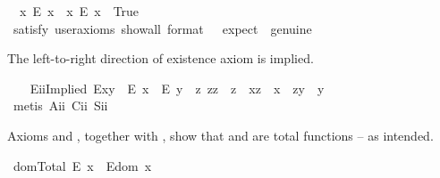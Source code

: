 \begin{isabellebody}
\ \ {\isachardoublequoteopen}{\isacharparenleft}{\isasymexists}x{\isachardot}\ \isactrlbold {\isasymnot}{\isacharparenleft}E\ x{\isacharparenright}{\isacharparenright}\ {\isasymand}\ {\isacharparenleft}{\isasymexists}x{\isachardot}\ {\isacharparenleft}E\ x{\isacharparenright}{\isacharparenright}{\isachardoublequoteclose}\ \ True\ \ %
\ \isanewline
\ \ \ \ \isamarkupfalse%
\ {\isacharbrackleft}satisfy{\isacharcomma}\ user{\isacharunderscore}axioms{\isacharcomma}\ show{\isacharunderscore}all{\isacharcomma}\ format\ {\isacharequal}\ {}{\isacharcomma}\ expect\ {\isacharequal}\ genuine{\isacharbrackright}%
\isadelimproof
\ %
\endisadelimproof
%
\isatagproof
{}\isamarkupfalse%
%
\endisatagproof
{\isafoldproof}%
%
\isadelimproof
%
\endisadelimproof
%
\begin{isamarkuptext}%
The left-to-right direction of existence axiom  is implied.%
\end{isamarkuptext}\isamarkuptrue%
\ \ \isamarkupfalse%
\ E\isactrlsub i\isactrlsub iImplied{\isacharcolon}\ {\isachardoublequoteopen}E{\isacharparenleft}x{\isasymcdot}y{\isacharparenright}\ \isactrlbold {\isasymrightarrow}\ {\isacharparenleft}E\ x\ \isactrlbold {\isasymand}\ E\ y\ \isactrlbold {\isasymand}\ {\isacharparenleft}\isactrlbold {\isasymexists}z{\isachardot}\ z{\isasymcdot}z\ {\isasymcong}\ z\ \isactrlbold {\isasymand}\ x{\isasymcdot}z\ {\isasymcong}\ x\ \isactrlbold {\isasymand}\ z{\isasymcdot}y\ {\isasymcong}\ y{\isacharparenright}{\isacharparenright}{\isachardoublequoteclose}\ \isanewline
%
\isadelimproof
\ \ \ \ %
\endisadelimproof
%
\isatagproof
{}\isamarkupfalse%
\ {\isacharparenleft}metis\ A\isactrlsub i\isactrlsub i\ C\isactrlsub i\isactrlsub i\ S\isactrlsub i\isactrlsub i{\isacharparenright}%
\endisatagproof
{\isafoldproof}%
%
\isadelimproof
%
\endisadelimproof
%
\begin{isamarkuptext}%
Axioms  and , together with , show that
 and  are total functions -- as intended.%
\end{isamarkuptext}\isamarkuptrue%
\isamarkupfalse%
\ domTotal{\isacharcolon}\ {\isachardoublequoteopen}E\ x\ \isactrlbold {\isasymrightarrow}\ E{\isacharparenleft}dom\ x{\isacharparenright}{\isachardoublequoteclose}\ \isanewline
%
\isadelimproof
\ \ %
\endisadelimproof
%
\isatagproof

\end{isabellebody}
